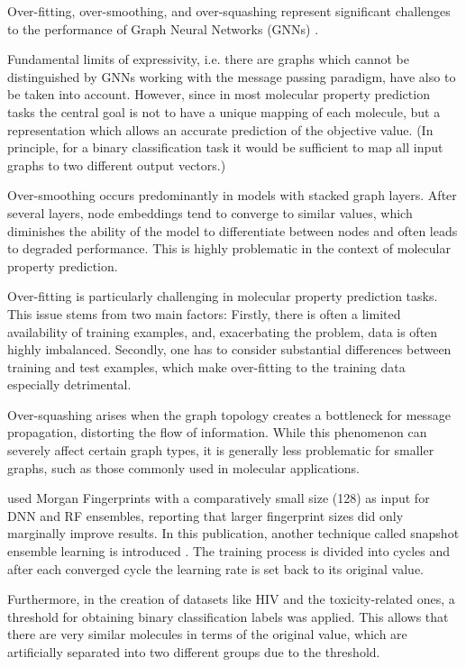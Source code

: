Over-fitting, over-smoothing, and over-squashing represent significant challenges to the performance of Graph Neural Networks (GNNs) \cite{JunXia.2023}.

Fundamental limits of expressivity, i.e. there are graphs which cannot be distinguished by GNNs working with the message passing paradigm, have also to be taken into account. However, since in most molecular property prediction tasks the central goal is not to have a unique mapping of each molecule, but a representation which allows an accurate prediction of the objective value. (In principle, for a binary classification task it would be sufficient to map all input graphs to two different output vectors.)


Over-smoothing occurs predominantly in models with stacked graph layers. After several layers, node embeddings tend to converge to similar values, which diminishes the ability of the model to differentiate between nodes and often leads to degraded performance. This is highly problematic in the context of molecular property prediction.


Over-fitting is particularly challenging in molecular property prediction tasks. This issue stems from two main factors: Firstly, there is often a limited availability of training examples, and, exacerbating the problem, data is often highly imbalanced. Secondly, one has to consider substantial differences between training and test examples, which make over-fitting to the training data especially detrimental.

Over-squashing arises when the graph topology creates a bottleneck for message propagation, distorting the flow of information. While this phenomenon can severely affect certain graph types, it is generally less problematic for smaller graphs, such as those commonly used in molecular applications.

\cite{CortesCiriano.2019} used Morgan Fingerprints with a comparatively small size (128) as input for DNN and RF ensembles, reporting that larger fingerprint sizes did only marginally improve results. In this publication, another technique called snapshot ensemble learning is introduced \cite{CortesCiriano.2019}. The training process is divided into cycles and after each converged cycle the learning rate is set back to its original value.

Furthermore, in the creation of datasets like HIV and the toxicity-related ones, a threshold for obtaining binary classification labels was applied. This allows that there are very similar molecules in terms of the original value, which are artificially separated into two different groups due to the threshold.




